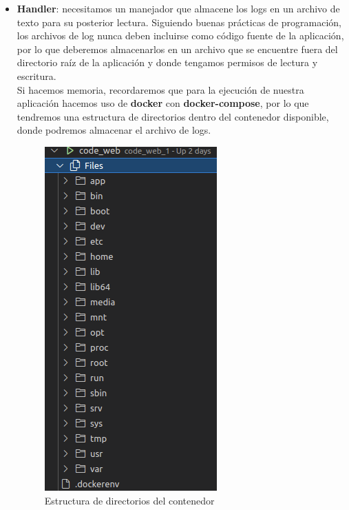 \begin{enumerate}
\begin{itemize}
                \item \textbf{Handler}: necesitamos un manejador que almacene los logs en
                un archivo de texto para su posterior lectura. Siguiendo buenas prácticas
                de programación, los archivos de log nunca deben incluirse como código
                fuente de la aplicación, por lo que deberemos almacenarlos en un archivo
                que se encuentre fuera del directorio raíz de la aplicación y donde
                tengamos permisos de lectura y escritura. \\
                
                Si hacemos memoria, recordaremos que para la ejecución de nuestra
                aplicación hacemos uso de \textbf{docker} con \textbf{docker-compose}, por
                lo que tendremos una estructura de directorios dentro del contenedor
                disponible, donde podremos almacenar el archivo de logs. 
                
                    \begin{figure}[H]
                        \centering
                        \includegraphics[scale=0.35]{imagenes/docker-structure.png}
                        \caption{Estructura de directorios del contenedor}
                        \label{fig:docker-structure}
                    \end{figure}
                

\end{itemize}
\end{enumerate}
